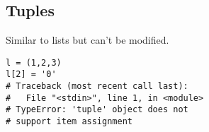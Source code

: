 \subsection{Tuples}

Similar to lists but can't be modified.

\begin{lstlisting}
l = (1,2,3)
l[2] = '0'
# Traceback (most recent call last):
#   File "<stdin>", line 1, in <module>
# TypeError: 'tuple' object does not 
# support item assignment
\end{lstlisting}
